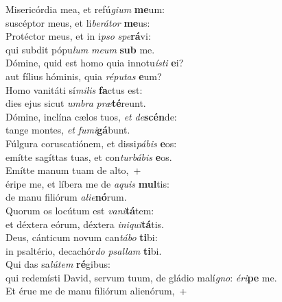 \evenverse Misericórdia mea, et refú\textit{gi}\textit{um} \textbf{me}um:~\*\\
\evenverse suscéptor meus, et li\textit{be}\textit{rá}\textit{tor} \textbf{me}us:\\
\oddverse Protéctor meus, et in i\textit{pso} \textit{spe}\textbf{rá}vi:~\*\\
\oddverse qui subdit pópu\textit{lum} \textit{me}\textit{um} \textbf{sub} me.\\
\evenverse Dómine, quid est homo quia innotu\textit{í}\textit{sti} \textbf{e}i?~\*\\
\evenverse aut fílius hóminis, quia \textit{ré}\textit{pu}\textit{tas} \textbf{e}um?\\
\oddverse Homo vanitáti sí\textit{mi}\textit{lis} \textbf{fa}ctus est:~\*\\
\oddverse dies ejus sicut \textit{um}\textit{bra} \textit{præ}\textbf{té}reunt.\\
\evenverse Dómine, inclína cælos tuos, \textit{et} \textit{de}\textbf{scén}de:~\*\\
\evenverse tange montes, \textit{et} \textit{fu}\textit{mi}\textbf{gá}bunt.\\
\oddverse Fúlgura coruscatiónem, et dissi\textit{pá}\textit{bis} \textbf{e}os:~\*\\
\oddverse emítte sagíttas tuas, et con\textit{tur}\textit{bá}\textit{bis} \textbf{e}os.\\
\evenverse Emítte manum tuam de alto,~+\\
\evenverse  éripe me, et líbera me de \textit{a}\textit{quis} \textbf{mul}tis:~\*\\
\evenverse de manu filiórum \textit{a}\textit{li}\textit{e}\textbf{nó}rum.\\
\oddverse Quorum os locútum est \textit{va}\textit{ni}\textbf{tá}tem:~\*\\
\oddverse et déxtera eórum, déxtera \textit{i}\textit{ni}\textit{qui}\textbf{tá}tis.\\
\evenverse Deus, cánticum novum can\textit{tá}\textit{bo} \textbf{ti}bi:~\*\\
\evenverse in psaltério, decachór\textit{do} \textit{psal}\textit{lam} \textbf{ti}bi.\\
\oddverse Qui das sa\textit{lú}\textit{tem} \textbf{ré}gibus:~\*\\
\oddverse qui redemísti David, servum tuum, de gládio malí\textit{gno}: \textit{é}\textit{ri}\textbf{pe} me.\\
\evenverse Et érue me de manu filiórum alienórum,~+\\
